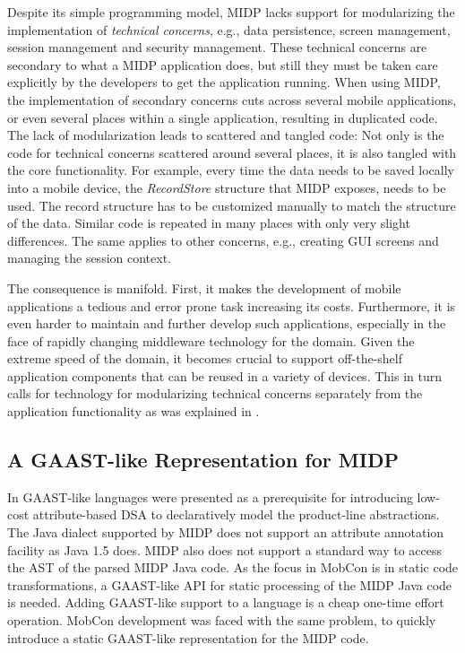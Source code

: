 Despite its simple programming model, MIDP lacks support for modularizing the implementation of \textit{technical concerns}, e.g., data persistence, screen management, session management and security management. These technical concerns \cite{parnas.72} are secondary to what a MIDP application does, but still they must be taken care  explicitly by the developers to get the application running. 
%
When using MIDP, the implementation of secondary concerns cuts across several mobile applications, or even several places within a single application, resulting in duplicated code.
The lack of modularization leads to scattered and tangled code: Not only is the code for technical concerns scattered around several places, it is also tangled with the core functionality. For example, every time the data needs to be saved locally into a mobile device, the \textit{RecordStore} structure that MIDP exposes, needs to be used. The record structure has to be customized manually to match the structure of the data. Similar code is repeated in many places with only very slight differences. The same applies to other concerns, e.g., creating GUI screens and managing the session context.  

The consequence is manifold. First, it makes the development of mobile applications a tedious and error prone task increasing its costs. Furthermore, it is even harder to maintain and further develop such applications, especially in the face of rapidly changing middleware technology for the domain. Given the extreme speed of the domain, it becomes crucial to support off-the-shelf application components that can be reused in a variety of devices. This in turn calls for technology for modularizing technical concerns separately from the application functionality as was explained in . 

\subsection{A GAAST-like Representation for MIDP}
\label{mc.gaast}

In  GAAST-like languages were presented as a prerequisite for introducing low-cost attribute-based DSA to declaratively model the product-line abstractions. The Java dialect supported by MIDP does not support an attribute annotation facility as Java 1.5 does. MIDP also does not support a standard way to access the AST of the parsed MIDP Java code. As the focus in MobCon is in static code transformations, a GAAST-like API for static processing of the MIDP Java code is needed. Adding GAAST-like support to a language is a cheap one-time effort operation. MobCon development was faced with the same problem, to quickly introduce a static GAAST-like representation for the MIDP code. 

